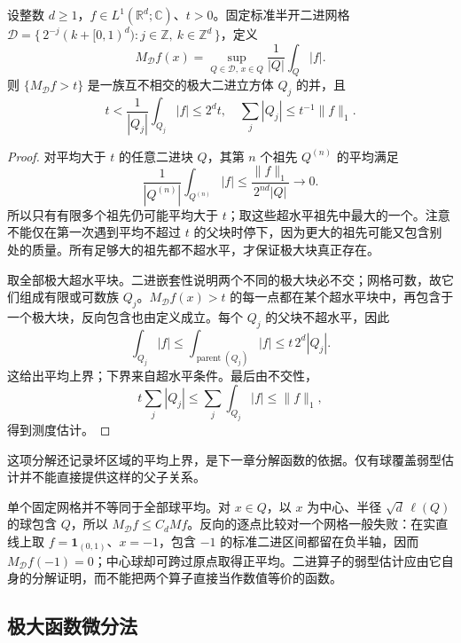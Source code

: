\begin{proposition}[二进超水平集合分解]\label{b2:thm:17-dyadic-level}
设整数 \(d\geq1\)，\(f\in L^1(\mathbb R^d;\mathbb C)\)、\(t>0\)。固定标准半开二进网格 \(\mathcal D=\{\,2^{-j}(k+[0,1)^d):j\in\mathbb Z,\ k\in\mathbb Z^d\,\}\)，定义
\[
 M_{\mathcal D}f(x)=\sup_{Q\in\mathcal D,\,x\in Q}\frac1{|Q|}\int_Q|f|.
\]
则 \(\{M_{\mathcal D}f>t\}\) 是一族互不相交的极大二进立方体 \(Q_j\) 的并，且
\[
 t<\dfrac1{|Q_j|}\int_{Q_j}|f|\leq2^dt,
 \quad \sum_j|Q_j|\leq t^{-1}\|f\|_1.
\]
\end{proposition}
\begin{proof}
对平均大于 \(t\) 的任意二进块 \(Q\)，其第 \(n\) 个祖先 \(Q^{(n)}\) 的平均满足
\[\frac1{|Q^{(n)}|}\int_{Q^{(n)}}|f|
 \leq\frac{\|f\|_1}{2^{nd}|Q|}\longrightarrow0.\]
所以只有有限多个祖先仍可能平均大于 \(t\)；取这些超水平祖先中最大的一个。注意不能仅在第一次遇到平均不超过 \(t\) 的父块时停下，因为更大的祖先可能又包含别处的质量。所有足够大的祖先都不超水平，才保证极大块真正存在。

取全部极大超水平块。二进嵌套性说明两个不同的极大块必不交；网格可数，故它们组成有限或可数族 \(Q_j\)。\(M_{\mathcal D}f(x)>t\) 的每一点都在某个超水平块中，再包含于一个极大块，反向包含也由定义成立。每个 \(Q_j\) 的父块不超水平，因此
\[\int_{Q_j}|f|\leq\int_{\operatorname{parent}(Q_j)}|f|
 \leq t\,2^d|Q_j|.\]
这给出平均上界；下界来自超水平条件。最后由不交性，
\[t\sum_j|Q_j|\leq\sum_j\int_{Q_j}|f|\leq\|f\|_1,\]
得到测度估计。
\end{proof}
这项分解还记录坏区域的平均上界，是下一章分解函数的依据。仅有球覆盖弱型估计并不能直接提供这样的父子关系。

\ProseParagraphBreak

单个固定网格并不等同于全部球平均。对 \(x\in Q\)，以 \(x\) 为中心、半径 \(\sqrt d\,\ell(Q)\) 的球包含 \(Q\)，所以 \(M_{\mathcal D}f\leq C_dMf\)。反向的逐点比较对一个网格一般失败：在实直线上取 \(f=\mathbf1_{(0,1)}\)、\(x=-1\)，包含 \(-1\) 的标准二进区间都留在负半轴，因而 \(M_{\mathcal D}f(-1)=0\)；中心球却可跨过原点取得正平均。二进算子的弱型估计应由它自身的分解证明，而不能把两个算子直接当作数值等价的函数。

\subsection{极大函数微分法}
\label{b2:subsec:170104}

